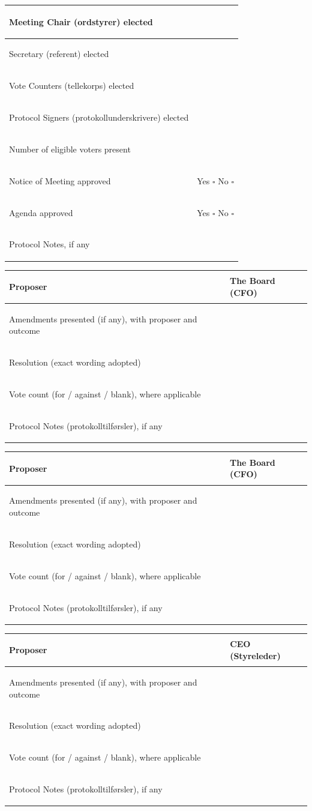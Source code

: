 \documentclass{../../../Common/Latex/Templates/rapport}
\newcommand{\caseblock}[1]{%
  \begin{tabularx}{\textwidth}{|>{\bfseries\raggedright\arraybackslash}p{5cm}|X|}
    \hline
    Proposer                                                 & \rule{0pt}{0.9cm}#1 \\
    \hline
    Amendments presented (if any), with proposer and outcome & \rule{0pt}{1.8cm}   \\
    \hline
    Resolution (exact wording adopted)                       & \rule{0pt}{1.8cm}   \\
    \hline
    Vote count (for / against / blank), where applicable     & \rule{0pt}{0.9cm}   \\
    \hline
    Protocol Notes (protokolltilførsler), if any             & \rule{0pt}{1.2cm}   \\
    \hline
  \end{tabularx}%
}
\begin{document}
\begin{tabularx}{\textwidth}{|>{\bfseries\raggedright\arraybackslash}p{5cm}|X|}
  \hline
  Meeting Chair (ordstyrer) elected                 & \rule{0pt}{0.9cm}                                                  \\
  \hline
  Secretary (referent) elected                      & \rule{0pt}{0.9cm}                                                  \\
  \hline
  Vote Counters (tellekorps) elected                & \rule{0pt}{0.9cm}                                                  \\
  \hline
  Protocol Signers (protokollunderskrivere) elected & \rule{0pt}{0.9cm}                                                  \\
  \hline
  Number of eligible voters present                 & \rule{0pt}{0.9cm}                                                  \\
  \hline
  Notice of Meeting approved                        & \rule{0pt}{0.9cm}Yes \quad $\square$ \quad\quad No \quad $\square$ \\
  \hline
  Agenda approved                                   & \rule{0pt}{0.9cm}Yes \quad $\square$ \quad\quad No \quad $\square$ \\
  \hline
  Protocol Notes, if any                            & \rule{0pt}{1.2cm}                                                  \\
  \hline
\end{tabularx}

\caseblock{The Board (CFO)}

\caseblock{The Board (CFO)}

\caseblock{CEO (Styreleder)}
\end{document}
